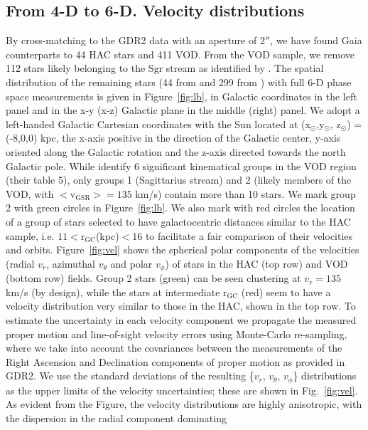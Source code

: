 \documentclass[fleqn,usenatbib]{mnras}
\begin{document}
\subsection{From 4-D to 6-D. Velocity distributions}
%
By cross-matching to the GDR2 data with an aperture of 2$''$, we have
found Gaia counterparts to 44 HAC stars and 411 VOD. From the VOD
sample, we remove 112 stars likely belonging to the Sgr stream as
identified by \citep[][, their group 1]{Vivas2016}. The spatial
distribution of the remaining stars (44 from \citealt{Simion2018} and
299 from \citealt{Vivas2016}) with full 6-D phase space measurements
is given in Figure~\ref{fig:lb}, in Galactic coordinates in the left
panel and in the x-y (x-z) Galactic plane in the middle (right)
panel. We adopt a left-handed Galactic Cartesian coordinates with the
Sun located at (x$_{\odot}$,y$_{\odot}$, z$_{\odot}$) = (-8,0,0) kpc,
the x-axis positive in the direction of the Galactic center, y-axis
oriented along the Galactic rotation and the z-axis directed towards
the north Galactic pole. While \citealt{Vivas2016} identify 6
significant kinematical groups in the VOD region (their table 5), only
groups 1 (Sagittarius stream) and 2 (likely members of the VOD, with
$\mathrm{<v_{GSR}>}= 135$ km/s) contain more than 10 stars. We mark
group 2 with green circles in Figure~\ref{fig:lb}. We also mark with
red circles the location of a group of stars selected to have
galactocentric distances similar to the HAC sample, i.e.
$11\mathrm{<r_{GC}}$(kpc)$<16$ to facilitate a fair comparison of their
velocities and orbits.
%
Figure~\ref{fig:vel} shows the spherical polar components of the
velocities (radial $v_{r}$, azimuthal $v_{\theta}$ and polar
$v_{\phi}$) of stars in the HAC (top row) and VOD (bottom row)
fields. Group 2 stars (green) can be seen clustering at $v_{r} = 135$
km/s (by design), while the stars at intermediate $\mathrm{r_{GC}}$
(red) seem to have a velocity distribution very similar to those in
the HAC, shown in the top row. To estimate the uncertainty in each
velocity component we propagate the measured proper motion and
line-of-sight velocity errors using Monte-Carlo re-sampling, where we
take into account the covariances between the measurements of the
Right Ascension and Declination components of proper motion as
provided in GDR2. We use the standard deviations of the resulting
\{$v_{r}$, $v_{\theta}$, $v_{\phi}$\} distributions as the upper limits
of the velocity uncertainties; these are shown in Fig.~\ref{fig:vel}.
%
As evident from the Figure, the velocity distributions are highly
anisotropic, with the dispersion in the radial component dominating
\end{document}
